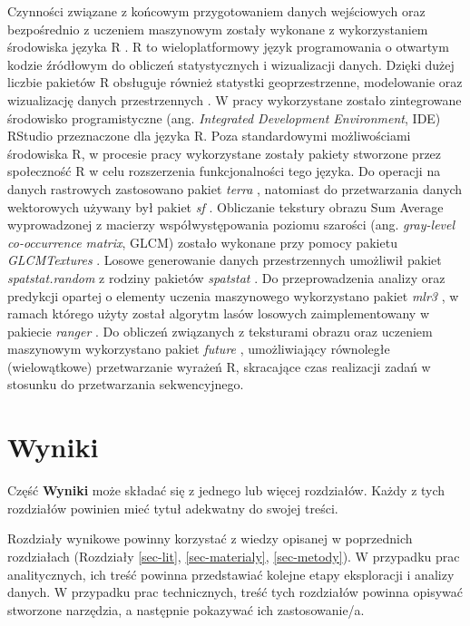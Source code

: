 \documentclass{amuthesis}
\begin{document}
Czynności związane z końcowym przygotowaniem danych wejściowych oraz
bezpośrednio z uczeniem maszynowym zostały wykonane z wykorzystaniem
środowiska języka R \autocite{R-base}. R to wieloplatformowy język
programowania o otwartym kodzie źródłowym do obliczeń statystycznych i
wizualizacji danych. Dzięki dużej liczbie pakietów R obsługuje również
statystki geoprzestrzenne, modelowanie oraz wizualizację danych
przestrzennych \autocite{lovelace_2019_geocomputation}. W pracy
wykorzystane zostało zintegrowane środowisko programistyczne (ang.
\emph{Integrated Development Environment}, IDE) RStudio
\autocite{rstudio_team_2020_rstudio} przeznaczone dla języka R. Poza
standardowymi możliwościami środowiska R, w procesie pracy wykorzystane
zostały pakiety stworzone przez społeczność R w celu rozszerzenia
funkcjonalności tego języka. Do operacji na danych rastrowych
zastosowano pakiet \emph{terra} \autocite{R-terra}, natomiast do
przetwarzania danych wektorowych używany był pakiet \emph{sf}
\autocite{R-sf}. Obliczanie tekstury obrazu Sum Average wyprowadzonej z
macierzy współwystępowania poziomu szarości (ang. \emph{gray-level
co-occurrence matrix}, GLCM) zostało wykonane przy pomocy pakietu
\emph{GLCMTextures} \autocite{R-GLCMTextures}. Losowe generowanie danych
przestrzennych umożliwił pakiet \emph{spatstat.random}
\autocite{R-spatstat.random} z rodziny pakietów \emph{spatstat}
\autocite{R-spatstat}. Do przeprowadzenia analizy oraz predykcji opartej
o elementy uczenia maszynowego wykorzystano pakiet \emph{mlr3}
\autocite{R-mlr3}, w ramach którego użyty został algorytm lasów losowych
zaimplementowany w pakiecie \emph{ranger} \autocite{R-ranger}. Do
obliczeń związanych z teksturami obrazu oraz uczeniem maszynowym
wykorzystano pakiet \emph{future} \autocite{R-future}, umożliwiający
równoległe (wielowątkowe) przetwarzanie wyrażeń R, skracające czas
realizacji zadań w stosunku do przetwarzania sekwencyjnego.


\hypertarget{sec-wyniki}{%
\chapter{Wyniki}\label{sec-wyniki}}

Część \textbf{Wyniki} może składać się z jednego lub więcej rozdziałów.
Każdy z tych rozdziałów powinien mieć tytuł adekwatny do swojej treści.

Rozdziały wynikowe powinny korzystać z wiedzy opisanej w poprzednich
rozdziałach (Rozdziały \ref{sec-lit}, \ref{sec-materialy},
\ref{sec-metody}). W przypadku prac analitycznych, ich treść powinna
przedstawiać kolejne etapy eksploracji i analizy danych. W przypadku
prac technicznych, treść tych rozdziałów powinna opisywać stworzone
narzędzia, a następnie pokazywać ich zastosowanie/a.
\end{document}

